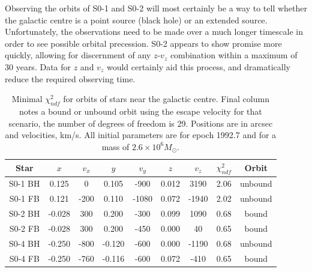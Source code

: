 Observing the orbits of S0-1 and S0-2 will most certainly be a way to tell whether the galactic centre is a point source (black hole) or
an extended source. Unfortunately, the observations need to be made over a much longer timescale in order to see possible orbital precession.
S0-2 appears to show promise more quickly, allowing for discernment of any $z$-$v_z$ combination within a maximum of 30 years.
Data for $z$ and $v_z$ would certainly aid this process, and dramatically reduce the required observing time.
\begin{table}[!p]
	\begin{center}
	\begin{tabular}{c c c c c c c c c}
	\hline
	\hline
	Star & $x$ & $v_x$ & $y$ & $v_y$ & $z$ & $v_z$ & $\chi^2_{ndf}$ & Orbit \\
	\hline
	S0-1 BH &  0.125 & 0    & 0.105  & -900  & 0.012 & 3190  & 2.06 & unbound \\
	S0-1 FB &  0.121 & -200 & 0.110  & -1080 & 0.072 & -1940 & 2.02 & unbound \\
	S0-2 BH & -0.028 & 300  & 0.200  & -300  & 0.099 & 1090  & 0.68 & bound \\
	S0-2 FB & -0.028 & 300  & 0.200  & -450  & 0.000 & 40    & 0.65 & bound \\
	S0-4 BH & -0.250 & -800 & -0.120 & -600  & 0.000 & -1190 & 0.68 & unbound \\
	S0-4 FB & -0.250 & -760 & -0.116 & -600  & 0.072 & -410  & 0.65 & bound \\
	\hline
	\end{tabular}
	\end{center}
	\caption{Minimal $\chi^2_{ndf}$ for orbits of stars near the galactic centre. Final column notes a bound or unbound
	orbit using the escape velocity for that scenario, the number of degrees of freedom is 29. Positions 
	are in arcsec and velocities, km/s. All initial parameters are for epoch 1992.7 and for a mass of
	$2.6 \times 10^6 M_\odot$.}
	\label{tab_minimalzvzchisquare}
\end{table}
